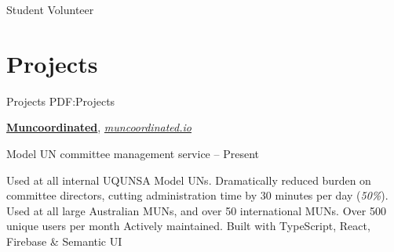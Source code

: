 \documentclass[a4paper,10pt,oneside]{article}
\begin{document}
\begin{minipage}[t][0pt]{\linewidth}
\begin{body}
\par Student Volunteer\hfill {} 

\begin{detail}
\end{detail}




\section
{Projects}
{Projects}
{PDF:Projects}

\href{https://muncoordinated.io}{\textbf{Muncoordinated}}, \href{https://muncoordinated.io}{\textit{muncoordinated.io}}
\par Model UN committee management service\hfill {} -- Present
\begin{detail}
	\BulletItem Used at all internal UQUNSA Model UNs. Dramatically reduced burden on committee directors, cutting administration time by 30 minutes per day (\textit{50\%}). Used at all large Australian MUNs, and over 50 international MUNs. Over 500 unique users per month
	\BulletItem Actively maintained. Built with TypeScript, React, Firebase \& Semantic UI
\end{detail}

\EntryGap



\end{body}
\end{minipage}
\end{document}
